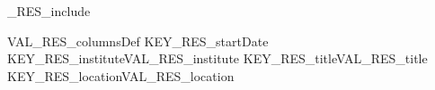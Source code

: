 
%
\ifVAL_RES_include %
\begin{myTableEnv}{VAL_RES_columnsDef}
    \myRow
        {KEY_RES_startDate}{}
        {KEY_RES_institute}{VAL_RES_institute}
    \myRow
        {KEY_RES_title}{VAL_RES_title}
        {KEY_RES_location}{VAL_RES_location}
\end{myTableEnv}
%
\fi
%